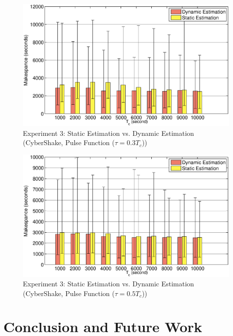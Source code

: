 \documentclass{IOS-Book-Article}
\begin{document}
\begin{figure}[!htb]
\centering
  \includegraphics[width=1\linewidth]{pulse_t30.eps}
  \caption{Experiment 3: Static Estimation vs. Dynamic Estimation (CyberShake, Pulse Function ($\tau=0.3T_c$))}
  \label{fig:expr_pulse_30}
\end{figure}

\begin{figure}[!htb]
\centering
  \includegraphics[width=1\linewidth]{pulse_t50.eps}
  \caption{Experiment 3: Static Estimation vs. Dynamic Estimation (CyberShake, Pulse Function ($\tau=0.5T_c$))}
  \label{fig:expr_pulse_50}
\end{figure}

\section{Conclusion and Future Work}
\end{document}
